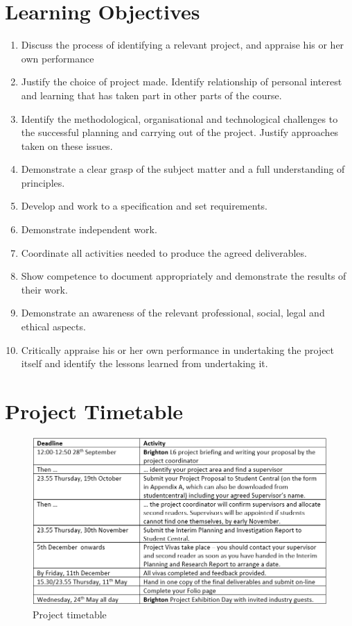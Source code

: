 \section{Learning Objectives}\label{learning-objectives}

\begin{enumerate}
\def\labelenumi{\arabic{enumi})}
\item
  Discuss the process of identifying a relevant project, and appraise
  his or her own performance
\item
  Justify the choice of project made. Identify relationship of personal
  interest and learning that has taken part in other parts of the
  course.
\item
  Identify the methodological, organisational and technological
  challenges to the successful planning and carrying out of the project.
  Justify approaches taken on these issues.
\item
  Demonstrate a clear grasp of the subject matter and a full
  understanding of principles.
\item
  Develop and work to a specification and set requirements.
\item
  Demonstrate independent work.
\item
  Coordinate all activities needed to produce the agreed deliverables.
\item
  Show competence to document appropriately and demonstrate the results
  of their work.
\item
  Demonstrate an awareness of the relevant professional, social, legal
  and ethical aspects.
\item
  Critically appraise his or her own performance in undertaking the
  project itself and identify the lessons learned from undertaking it.
\end{enumerate}

\section{Project Timetable}\label{project-timetable}

\begin{figure}[htbp]
\centering
\includegraphics{./Images/projecttimetable.png}
\caption{Project timetable}
\end{figure}

